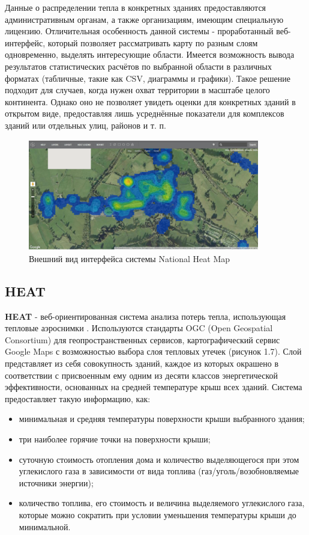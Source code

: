  	Данные о распределении тепла в конкретных зданиях предоставляются административным органам, а также организациям, имеющим специальную лицензию. Отличительная особенность данной системы - проработанный веб-интерфейс, который позволяет рассматривать карту по разным слоям одновременно, выделять интересующие области. Имеется возможность вывода результатов статистических расчётов по выбранной области в различных форматах (табличные, такие как {CSV}, диаграммы и графики). Такое решение подходит для случаев, когда нужен охват территории в масштабе целого континента. Однако оно не позволяет увидеть оценки для конкретных зданий в открытом виде, предоставляя лишь усреднённые показатели для комплексов зданий или отдельных улиц, районов и т. п.

 	\begin{figure}[h!]
      \centering
      \includegraphics[width=0.9\textwidth]{images/screens/1_nhm.png}
      \caption{Внешний вид интерфейса системы National Heat Map}
      \label{screens:nhm}
    \end{figure}

\subsection{HEAT}

\par
	\textbf{HEAT} - веб-ориентированная система анализа потерь тепла, использующая тепловые аэроснимки \cite{problem:heat}. Используются стандарты {OGC} (Open Geospatial Consortium) для геопространственных сервисов, картографический сервис {Google Maps} с возможностью выбора слоя тепловых утечек (рисунок 1.7). Слой представляет из себя совокупность зданий, каждое из которых окрашено в соответствии с присвоенным ему одним из десяти классов энергетической эффективности, основанных на средней температуре крыш всех зданий. Система предоставляет такую информацию, как:

	\begin{itemize}
		\item минимальная и средняя температуры поверхности крыши выбранного здания;
		\item три наиболее горячие точки на поверхности крыши;
		\item суточную стоимость отопления дома и количество выделяющегося при этом углекислого газа в зависимости от вида топлива (газ/уголь/возобновляемые источники энергии);
		\item количество топлива, его стоимость и величина выделяемого углекислого газа, которые можно сократить при условии уменьшения температуры крыши до минимальной.
	\end{itemize}

